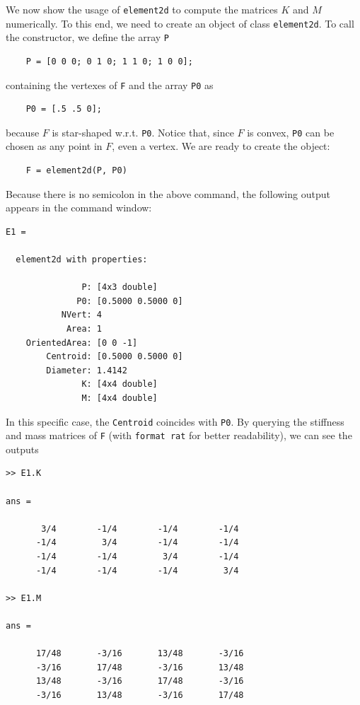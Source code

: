 \documentclass[a4paper]{article}
\begin{document}
\noindent
We now show the usage of \texttt{element2d} to compute the matrices $K$ and $M$ numerically. To this end, we need to create an object of class \texttt{element2d}. To call the constructor, we define the array \texttt{P}
\begin{lstlisting}
	P = [0 0 0; 0 1 0; 1 1 0; 1 0 0];
\end{lstlisting}
containing the vertexes of \texttt{F} and the array \texttt{P0} as
\begin{lstlisting}
	P0 = [.5 .5 0];
\end{lstlisting}
because $F$ is star-shaped w.r.t. \texttt{P0}. Notice that, since $F$ is convex,  \texttt{P0} can be chosen as any point in $F$, even a vertex. We are ready to create the object:
\begin{lstlisting}
	F = element2d(P, P0)
\end{lstlisting}
Because there is no semicolon in the above command, the following output appears in the command window:
\begin{lstlisting}
E1 = 

  element2d with properties:

               P: [4x3 double]
              P0: [0.5000 0.5000 0]
           NVert: 4
            Area: 1
    OrientedArea: [0 0 -1]
        Centroid: [0.5000 0.5000 0]
        Diameter: 1.4142
               K: [4x4 double]
               M: [4x4 double]
\end{lstlisting}

\noindent
In this specific case, the \texttt{Centroid} coincides with \texttt{P0}. By querying the stiffness and mass matrices of \texttt{F} (with \texttt{format rat} for better readability), we can see the outputs

\begin{lstlisting}
>> E1.K

ans =

       3/4        -1/4        -1/4        -1/4     
      -1/4         3/4        -1/4        -1/4     
      -1/4        -1/4         3/4        -1/4     
      -1/4        -1/4        -1/4         3/4     
      
>> E1.M

ans =

      17/48       -3/16       13/48       -3/16    
      -3/16       17/48       -3/16       13/48    
      13/48       -3/16       17/48       -3/16    
      -3/16       13/48       -3/16       17/48    
\end{lstlisting}
\end{document}
